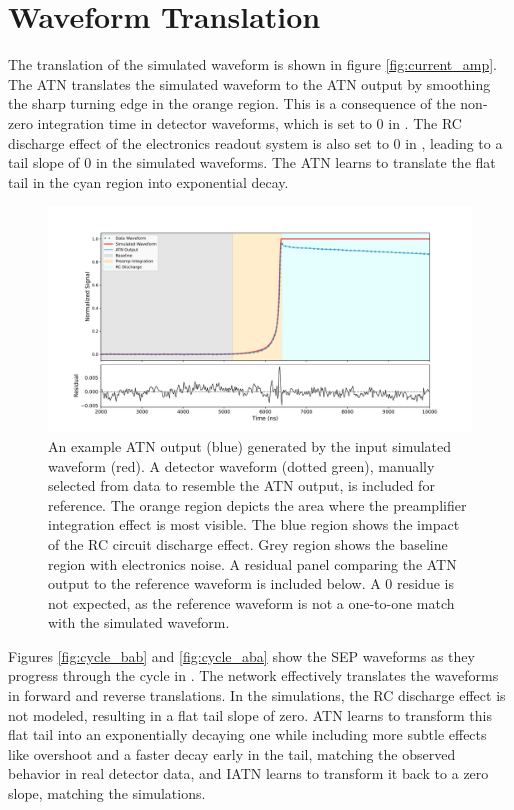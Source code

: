 \section{Waveform Translation}
The translation of the simulated waveform is shown in figure \ref{fig:current_amp}. The ATN translates the simulated waveform to the ATN output by smoothing the sharp turning edge in the orange region. This is a consequence of the non-zero integration time in detector waveforms, which is set to $0$ in {\siggen}. The RC discharge effect of the electronics readout system is also set to 0 in {\siggen}, leading to a tail slope of 0 in the simulated waveforms. The ATN learns to translate the flat tail in the cyan region into exponential decay.

\begin{figure}[htb!]
    \includegraphics[width=\linewidth,trim={2.5cm 0pc 3.5cm 0pc},clip]{ch8/figs/wf_comp_sim_atn_data.pdf}
    \caption{An example ATN output (blue) generated by the input simulated waveform (red). A detector waveform (dotted green), manually selected from data to resemble the ATN output, is included for reference. The orange region depicts the area where the preamplifier integration effect is most visible. The blue region shows the impact of the RC circuit discharge effect. Grey region shows the baseline region with electronics noise. A residual panel comparing the ATN output to the reference waveform is included below. A 0 residue is not expected, as the reference waveform is not a one-to-one match with the simulated waveform.} 

   \label{fig:sample_result}
\end{figure}

Figures \ref{fig:cycle_bab} and \ref{fig:cycle_aba} show the SEP waveforms as they progress through the cycle in {\cpunet}. The network effectively translates the waveforms in forward and reverse translations. In the {\siggen} simulations, the RC discharge effect is not modeled, resulting in a flat tail slope of zero. ATN learns to transform this flat tail into an exponentially decaying one while including more subtle effects like overshoot and a faster decay early in the tail, matching the observed behavior in real detector data, and IATN learns to transform it back to a zero slope, matching the simulations.

